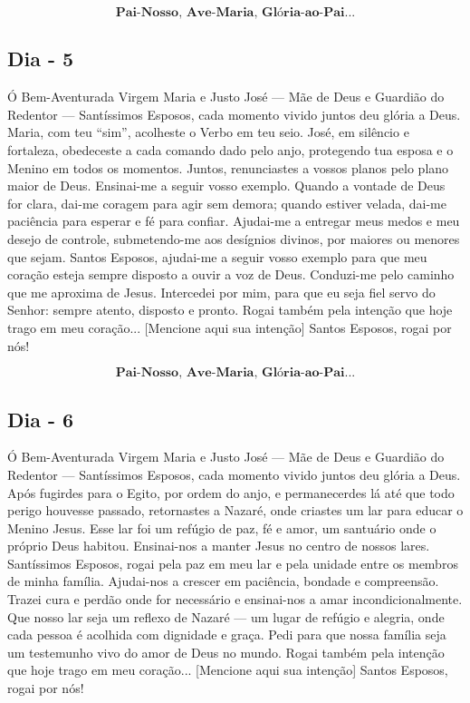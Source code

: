 \documentclass[a4paper,14pt]{extarticle} \usepackage[utf8]{inputenc}
\begin{document}
\[\textbf{Pai-Nosso, Ave-Maria, Glória-ao-Pai...}\]

\subsection{Dia - 5}

Ó Bem-Aventurada Virgem Maria e Justo José — Mãe de Deus e Guardião do Redentor — Santíssimos Esposos, cada momento vivido juntos deu glória a Deus.
Maria, com teu “sim”, acolheste o Verbo em teu seio. José, em silêncio e fortaleza, obedeceste a cada comando dado pelo anjo, protegendo tua esposa e o Menino em todos os momentos. Juntos, renunciastes a vossos planos pelo plano maior de Deus. Ensinai-me a seguir vosso exemplo. Quando a vontade de Deus for clara, dai-me coragem para agir sem demora; quando estiver velada, dai-me paciência para esperar e fé para confiar. Ajudai-me a entregar meus medos e meu desejo de controle, submetendo-me aos desígnios divinos, por maiores ou menores que sejam.
Santos Esposos, ajudai-me a seguir vosso exemplo para que meu coração esteja sempre disposto a ouvir a voz de Deus. Conduzi-me pelo caminho que me aproxima de Jesus. Intercedei por mim, para que eu seja fiel servo do Senhor: sempre atento, disposto e pronto. Rogai também pela intenção que hoje trago em meu coração... [Mencione aqui sua intenção] Santos Esposos, rogai por nós!

\[\textbf{Pai-Nosso, Ave-Maria, Glória-ao-Pai...}\]

\subsection{Dia - 6}

Ó Bem-Aventurada Virgem Maria e Justo José — Mãe de Deus e Guardião do Redentor — Santíssimos Esposos, cada momento vivido juntos deu glória a Deus.
Após fugirdes para o Egito, por ordem do anjo, e permanecerdes lá até que todo perigo houvesse passado, retornastes a Nazaré, onde criastes um lar para educar o Menino Jesus. Esse lar foi um refúgio de paz, fé e amor, um santuário onde o próprio Deus habitou. Ensinai-nos a manter Jesus no centro de nossos lares.
Santíssimos Esposos, rogai pela paz em meu lar e pela unidade entre os membros de minha família. Ajudai-nos a crescer em paciência, bondade e compreensão. Trazei cura e perdão onde for necessário e ensinai-nos a amar incondicionalmente. Que nosso lar seja um reflexo de Nazaré — um lugar de refúgio e alegria, onde cada pessoa é acolhida com dignidade e graça. Pedi para que nossa família seja um testemunho vivo do amor de Deus no mundo. Rogai também pela intenção que hoje trago em meu coração... [Mencione aqui sua intenção] Santos Esposos, rogai por nós!
\end{document}
